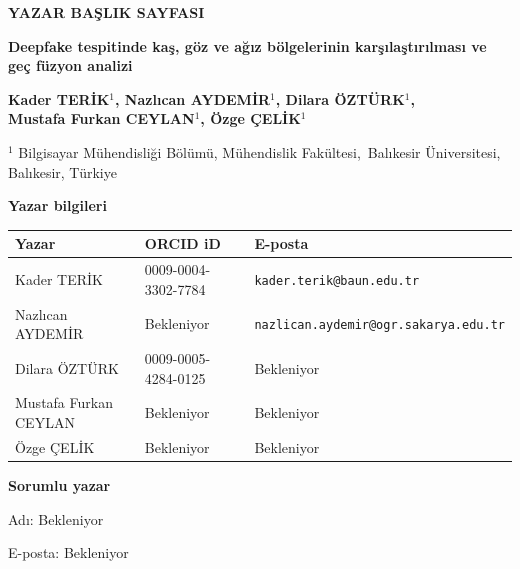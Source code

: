 \documentclass[11pt,a4paper]{article}
\begin{document}
\textbf{YAZAR BAŞLIK SAYFASI}\par\vspace{15pt}
\begin{center}{\Large\bfseries Deepfake tespitinde kaş, göz ve ağız bölgelerinin karşılaştırılması ve geç füzyon analizi\par}\vspace{18pt}
{\bfseries Kader TERİK$^{1}$, Nazlıcan AYDEMİR$^{1}$, Dilara ÖZTÜRK$^{1}$,\\ Mustafa Furkan CEYLAN$^{1}$, Özge ÇELİK$^{1}$\par}\vspace{14pt}
$^{1}$ Bilgisayar Mühendisliği Bölümü, Mühendislik Fakültesi,\ Balıkesir Üniversitesi, Balıkesir, Türkiye
\end{center}\vspace{15pt}
\textbf{Yazar bilgileri}\par
\small\begin{tabular}{@{}p{3.8cm}p{4.0cm}p{7.3cm}@{}}\toprule
Yazar & ORCID iD & E-posta\\\midrule
Kader TERİK & 0009-0004-3302-7784 & \nolinkurl{kader.terik@baun.edu.tr}\\[12pt]
Nazlıcan AYDEMİR & Bekleniyor & \nolinkurl{nazlican.aydemir@ogr.sakarya.edu.tr}\\[12pt]
Dilara ÖZTÜRK & 0009-0005-4284-0125 & Bekleniyor\\[12pt]
Mustafa Furkan CEYLAN & Bekleniyor & Bekleniyor\\[12pt]
Özge ÇELİK & Bekleniyor & Bekleniyor\\[12pt]
\bottomrule\end{tabular}\normalsize\par\vspace{24pt}
\textbf{Sorumlu yazar}\par
Adı: Bekleniyor\par
E-posta: Bekleniyor
\end{document}
